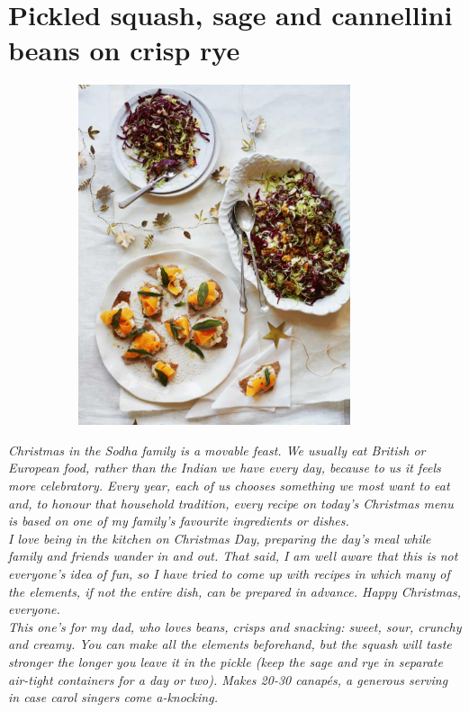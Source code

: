 \documentclass{book}
\begin{document}
\section{Pickled squash, sage and cannellini beans on crisp rye}
\begin{figure}
\centering\includegraphics[width=10cm,height=10cm,keepaspectratio]{Recipe_Pictures/Pickled_squash,_sage_and_cannellini_beans_on_crisp_rye.png}
\end{figure}
\emph{Christmas in the Sodha family is a movable feast. We usually eat British or European food, rather than the Indian we have every day, because to us it feels more celebratory. Every year, each of us chooses something we most want to eat and, to honour that household tradition, every recipe on today’s Christmas menu is based on one of my family’s favourite ingredients or dishes.\\ 
I love being in the kitchen on Christmas Day, preparing the day’s meal while family and friends wander in and out. That said, I am well aware that this is not everyone’s idea of fun, so I have tried to come up with recipes in which many of the elements, if not the entire dish, can be prepared in advance. Happy Christmas, everyone.\\ 
This one’s for my dad, who loves beans, crisps and snacking: sweet, sour, crunchy and creamy. You can make all the elements beforehand, but the squash will taste stronger the longer you leave it in the pickle (keep the sage and rye in separate air-tight containers for a day or two). Makes 20-30 canapés, a generous serving in case carol singers come a-knocking.}\\\\ 
\end{document}
